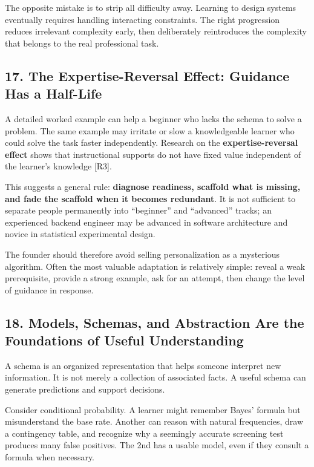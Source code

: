 The opposite mistake is to strip all difficulty away. Learning to design systems eventually requires handling interacting constraints. The right progression reduces irrelevant complexity early, then deliberately reintroduces the complexity that belongs to the real professional task.

\subsection*{17. The Expertise-Reversal Effect: Guidance Has a Half-Life}

A detailed worked example can help a beginner who lacks the schema to solve a problem. The same example may irritate or slow a knowledgeable learner who could solve the task faster independently. Research on the \textbf{expertise-reversal effect} shows that instructional supports do not have fixed value independent of the learner's knowledge [R3].

This suggests a general rule: \textbf{diagnose readiness, scaffold what is missing, and fade the scaffold when it becomes redundant}. It is not sufficient to separate people permanently into ``beginner'' and ``advanced'' tracks; an experienced backend engineer may be advanced in software architecture and novice in statistical experimental design.

The founder should therefore avoid selling personalization as a mysterious algorithm. Often the most valuable adaptation is relatively simple: reveal a weak prerequisite, provide a strong example, ask for an attempt, then change the level of guidance in response.

\subsection*{18. Models, Schemas, and Abstraction Are the Foundations of Useful Understanding}

A schema is an organized representation that helps someone interpret new information. It is not merely a collection of associated facts. A useful schema can generate predictions and support decisions.

Consider conditional probability. A learner might remember Bayes' formula but misunderstand the base rate. Another can reason with natural frequencies, draw a contingency table, and recognize why a seemingly accurate screening test produces many false positives. The 2nd has a usable model, even if they consult a formula when necessary.

